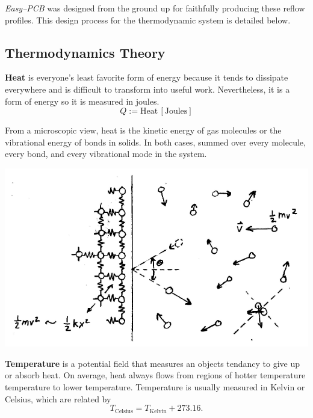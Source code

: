 \documentclass[10pt, twocolumn]{article}
\begin{document}
\emph{Easy--PCB} was designed from the ground up for faithfully producing these
reflow profiles. This design process for the thermodynamic system is detailed below.

\subsection{Thermodynamics Theory}

\textbf{Heat} is everyone's least favorite form of energy because it
tends to dissipate everywhere and is difficult to transform into useful work.
Nevertheless, it is a form of energy so it is measured in joules.
\begin{equation*}
Q:=\textrm{Heat}\,[\textrm{Joules}]
\end{equation*}

From a microscopic view, heat is the kinetic energy of gas molecules or the
vibrational energy of bonds in solids. In both cases, summed over every
molecule, every bond, and every vibrational mode in the system.

\begin{center}
	\includegraphics[width=1\columnwidth]{Figures/microscopic-view.pdf}
	\label{microscopic-view}
\end{center}

\textbf{Temperature} is a potential field that measures an objects
tendancy to give up or absorb heat.
On average, heat always flows from regions of hotter temperature temperature
to lower temperature.
Temperature is usually measured in Kelvin or Celsius, which are related by
\begin{equation*}
T_{\textrm{Celsius}}=T_{\textrm{Kelvin}}+273.16.
\end{equation*}
\end{document}
